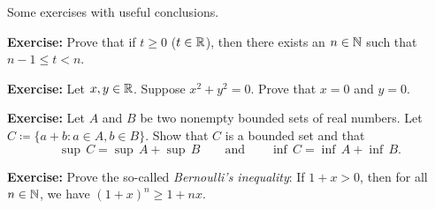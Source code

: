 \documentclass[10pt,aspectratio=169]{beamer}
\begin{document}
\begin{frame}
Some exercises with useful conclusions.

\medskip
\pause

\textbf{Exercise:}
Prove that
if $t \geq 0$ ($t \in {\mathbb{R}}$), then there exists an $n \in {\mathbb{N}}$ such that $n-1 \leq t < n$.

\medskip
\pause

\textbf{Exercise:}
Let $x, y \in {\mathbb{R}}$.  Suppose $x^2 + y^2 = 0$.  Prove that 
$x = 0$ and $y = 0$.

\medskip
\pause

\textbf{Exercise:}
Let $A$ and $B$ be two nonempty bounded sets of real numbers.  Let
$C \coloneqq \{ a+b : a \in A, b \in B \}$.
Show that $C$ is a bounded set and that
\begin{equation*}
\sup\,C = \sup\,A + \sup\,B 
\qquad \text{and} \qquad
\inf\,C = \inf\,A + \inf\,B .
\end{equation*}

%

\medskip
\pause

\textbf{Exercise:}
Prove the so-called \emph{Bernoulli's inequality}: If $1+x > 0$, then
for all $n \in {\mathbb{N}}$, we have $(1+x)^n \geq 1+nx$.

\end{frame}
\end{document}
